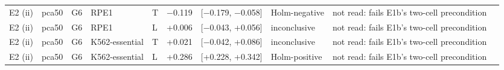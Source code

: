 \begin{tabular}{llllllllll}
E2 (ii) & pca50 & G6 & RPE1 & T & −0.119 & [−0.179, −0.058] & Holm-negative & not read: fails E1b's two-cell precondition &  \\
E2 (ii) & pca50 & G6 & RPE1 & L & +0.006 & [−0.043, +0.056] & inconclusive & not read: fails E1b's two-cell precondition &  \\
E2 (ii) & pca50 & G6 & K562-essential & T & +0.021 & [−0.042, +0.086] & inconclusive & not read: fails E1b's two-cell precondition &  \\
E2 (ii) & pca50 & G6 & K562-essential & L & +0.286 & [+0.228, +0.342] & Holm-positive & not read: fails E1b's two-cell precondition &  \\
\bottomrule
\end{tabular}
